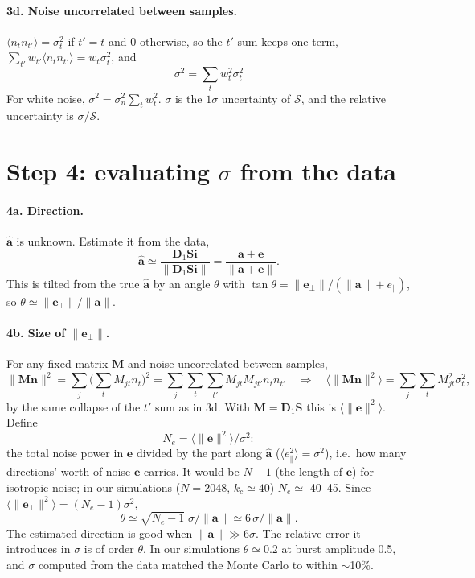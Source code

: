 \documentclass[11pt]{article}
\newcommand{\vb}[1]{\boldsymbol{#1}}
\newcommand{\Dn}{\vb D_1}
\newcommand{\Sm}{\vb S}
\newcommand{\ah}{\hat{\vb a}}
\newcommand{\nrm}[1]{\lVert #1\rVert}
\newcommand{\na}{\nrm{\vb a}}
\newcommand{\Sc}{\mathcal S}
\newcommand{\ep}{e_\parallel}
\newcommand{\eperp}{\vb e_\perp}
\begin{document}
\paragraph{3d. Noise uncorrelated between samples.}
$\langle n_tn_{t'}\rangle=\sigma_t^{2}$ if $t'=t$ and $0$ otherwise, so the $t'$ sum keeps one term,
$\sum_{t'}w_{t'}\langle n_tn_{t'}\rangle=w_t\sigma_t^{2}$, and
\begin{equation}
\boxed{\;\sigma^{2}=\sum_tw_t^{2}\sigma_t^{2}\;}
\label{eq:sig}
\end{equation}
For white noise, $\sigma^{2}=\sigma_n^{2}\sum_tw_t^{2}$. $\sigma$ is the $1\sigma$ uncertainty of $\Sc$, and the
relative uncertainty is $\sigma/\Sc$.

\section*{Step 4: evaluating $\sigma$ from the data}

\paragraph{4a. Direction.}
$\ah$ is unknown. Estimate it from the data,
\begin{equation}
\ah\simeq\frac{\Dn\Sm\vb i}{\nrm{\Dn\Sm\vb i}}=\frac{\vb a+\vb e}{\nrm{\vb a+\vb e}} .
\end{equation}
This is tilted from the true $\ah$ by an angle $\theta$ with $\tan\theta=\nrm{\eperp}/(\na+\ep)$, so
$\theta\simeq\nrm{\eperp}/\na$.

\paragraph{4b. Size of $\nrm{\eperp}$.}
For any fixed matrix $\vb M$ and noise uncorrelated between samples,
\begin{equation}
\nrm{\vb M\vb n}^{2}=\sum_j\Big(\sum_tM_{jt}n_t\Big)^{2}=\sum_j\sum_t\sum_{t'}M_{jt}M_{jt'}n_tn_{t'}
\quad\Rightarrow\quad
\langle\nrm{\vb M\vb n}^{2}\rangle=\sum_j\sum_tM_{jt}^{2}\sigma_t^{2},
\label{eq:Mn}
\end{equation}
by the same collapse of the $t'$ sum as in 3d. With $\vb M=\Dn\Sm$ this is $\langle\nrm{\vb e}^{2}\rangle$. Define
\begin{equation}
N_e=\langle\nrm{\vb e}^{2}\rangle/\sigma^{2}:
\end{equation}
the total noise power in $\vb e$ divided by the part along $\ah$ ($\langle\ep^{2}\rangle=\sigma^{2}$), i.e.\ how many
directions' worth of noise $\vb e$ carries. It would be $N-1$ (the length of $\vb e$) for isotropic noise; in our
simulations ($N=2048$, $k_c\simeq40$) $N_e\simeq$ 40--45. Since $\langle\nrm{\eperp}^{2}\rangle=(N_e-1)\sigma^{2}$,
\begin{equation}
\theta\simeq\sqrt{N_e-1}\;\sigma/\na\simeq6\,\sigma/\na .
\end{equation}
The estimated direction is good when $\na\gg6\sigma$. The relative error it introduces in $\sigma$ is of order $\theta$.
In our simulations $\theta\simeq0.2$ at burst amplitude 0.5, and $\sigma$ computed from the data matched the Monte Carlo
to within $\sim$10\%.
\end{document}
